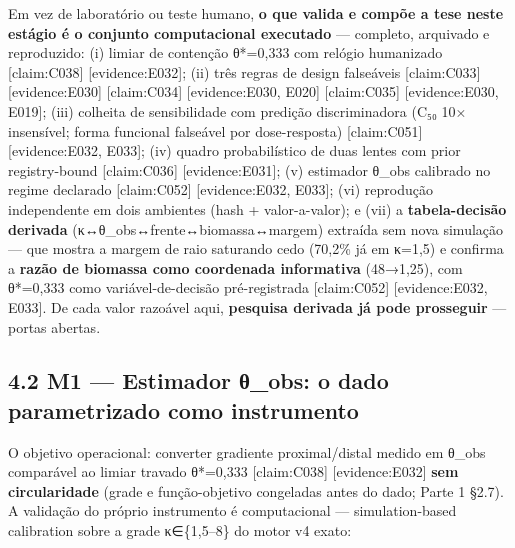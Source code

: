 \documentclass[
  12pt,
]{report}
\begin{document}
Em vez de laboratório ou teste humano, \textbf{o que valida e compõe a
tese neste estágio é o conjunto computacional executado} --- completo,
arquivado e reproduzido: (i) limiar de contenção θ*=0,333 com relógio
humanizado {[}claim:C038{]} {[}evidence:E032{]}; (ii) três regras de
design falseáveis {[}claim:C033{]} {[}evidence:E030{]} {[}claim:C034{]}
{[}evidence:E030, E020{]} {[}claim:C035{]} {[}evidence:E030, E019{]};
(iii) colheita de sensibilidade com predição discriminadora (C₅₀ 10×
insensível; forma funcional falseável por dose-resposta)
{[}claim:C051{]} {[}evidence:E032, E033{]}; (iv) quadro probabilístico
de duas lentes com prior registry-bound {[}claim:C036{]}
{[}evidence:E031{]}; (v) estimador θ\_obs calibrado no regime declarado
{[}claim:C052{]} {[}evidence:E032, E033{]}; (vi) reprodução independente
em dois ambientes (hash + valor-a-valor); e (vii) a
\textbf{tabela-decisão derivada} (κ↔θ\_obs↔frente↔biomassa↔margem)
extraída sem nova simulação --- que mostra a margem de raio saturando
cedo (70,2\% já em κ=1,5) e confirma a \textbf{razão de biomassa como
coordenada informativa} (48→1,25), com θ*=0,333 como variável-de-decisão
pré-registrada {[}claim:C052{]} {[}evidence:E032, E033{]}. De cada valor
razoável aqui, \textbf{pesquisa derivada já pode prosseguir} --- portas
abertas.

\hypertarget{m1-estimador-ux3b8_obs-o-dado-parametrizado-como-instrumento}{%
\subsection{4.2 M1 --- Estimador θ\_obs: o dado parametrizado como
instrumento}\label{m1-estimador-ux3b8_obs-o-dado-parametrizado-como-instrumento}}

O objetivo operacional: converter gradiente proximal/distal medido em
θ\_obs comparável ao limiar travado θ*=0,333 {[}claim:C038{]}
{[}evidence:E032{]} \textbf{sem circularidade} (grade e função-objetivo
congeladas antes do dado; Parte 1 §2.7). A validação do próprio
instrumento é computacional --- simulation-based calibration sobre a
grade κ∈\{1,5--8\} do motor v4 exato:
\end{document}
